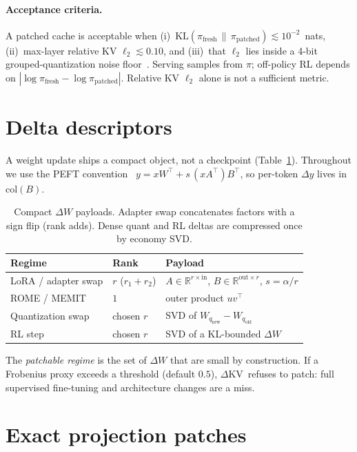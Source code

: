 \documentclass{article}
\newcommand{\dkv}{$\Delta$KV}
\begin{document}
\paragraph{Acceptance criteria.}
A patched cache is acceptable when
(i)~$\mathrm{KL}(\pi_{\mathrm{fresh}}\,\|\,\pi_{\mathrm{patched}})\lesssim 10^{-2}$~nats,
(ii)~max-layer relative KV $\ell_2\lesssim 0.10$, and
(iii)~that $\ell_2$ lies inside a 4-bit grouped-quantization noise
floor~\citep{liu2024kivi}.
Serving samples from $\pi$; off-policy RL depends on
$|\log\pi_{\mathrm{fresh}}-\log\pi_{\mathrm{patched}}|$.
Relative KV $\ell_2$ alone is not a sufficient metric.

\section{Delta descriptors}
\label{sec:delta}

A weight update ships a compact object, not a checkpoint
(Table~\ref{tab:delta}).
Throughout we use the PEFT convention~\citep{mangrulkar2022peft}
$y=xW^\top + s\,(xA^\top)B^\top$, so per-token $\Delta y$ lives in
$\mathrm{col}(B)$.

\begin{table}[t]
\centering
\caption{Compact $\Delta W$ payloads. Adapter swap concatenates factors
with a sign flip (rank adds). Dense quant and RL deltas are compressed
once by economy SVD.}
\label{tab:delta}
\begin{tabular}{@{}llp{4.6cm}@{}}
\toprule
Regime & Rank & Payload \\
\midrule
LoRA / adapter swap & $r$ ($r_1+r_2$) &
  $A\in\mathbb{R}^{r\times\mathrm{in}}$, $B\in\mathbb{R}^{\mathrm{out}\times r}$, $s=\alpha/r$ \\
ROME / MEMIT & $1$ & outer product $uv^\top$ \\
Quantization swap & chosen $r$ & SVD of $W_{q_{\mathrm{new}}}-W_{q_{\mathrm{old}}}$ \\
RL step & chosen $r$ & SVD of a KL-bounded $\Delta W$ \\
\bottomrule
\end{tabular}
\end{table}

The \emph{patchable regime} is the set of $\Delta W$ that are small by
construction.
If a Frobenius proxy exceeds a threshold (default $0.5$), \dkv\ refuses
to patch: full supervised fine-tuning and architecture changes are a
miss.

\section{Exact projection patches}
\label{sec:exact}
\end{document}
